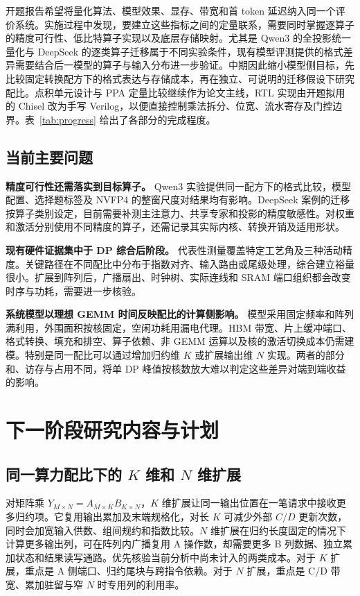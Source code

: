 \documentclass[10.5pt,compsoc,UTF8]{CjC}
\begin{document}
开题报告希望将量化算法、模型效果、显存、带宽和首 token 延迟纳入同一个评价系统。实施过程中发现，要建立这些指标之间的定量联系，需要同时掌握逐算子的精度可行性、低比特算子实现以及底层存储映射。尤其是 Qwen3 的全投影统一量化与 DeepSeek 的逐类算子迁移属于不同实验条件，现有模型评测提供的格式差异需要结合后一模型的算子与输入分布进一步验证。中期因此缩小模型侧目标，先比较固定转换配方下的格式表达与存储成本，再在独立、可说明的迁移假设下研究配比。点积单元设计与 PPA 定量比较继续作为论文主线，RTL 实现由开题拟用的 Chisel 改为手写 Verilog，以便直接控制乘法拆分、位宽、流水寄存及门控边界。表~\ref{tab:progress} 给出了各部分的完成程度。

\subsection{当前主要问题}

\textbf{精度可行性还需落实到目标算子。}
Qwen3 实验提供同一配方下的格式比较，模型配置、选择题标签及 NVFP4 的整窗尺度对结果均有影响。DeepSeek 案例的迁移按算子类别设定，目前需要补测主注意力、共享专家和投影的精度敏感性。对权重和激活分别使用不同精度的算子，还需记录其实际内核、转换开销及适用形状。

\textbf{现有硬件证据集中于 DP 综合后阶段。}
代表性测量覆盖特定工艺角及三种活动精度。关键路径在不同配比中分布于指数对齐、输入路由或尾级处理，综合建立裕量很小。扩展到阵列后，广播扇出、时钟树、实际连线和 SRAM 端口组织都会改变时序与功耗，需要进一步核验。

\textbf{系统模型以理想 GEMM 时间反映配比的计算侧影响。}
模型采用固定频率和阵列满利用，外围面积按核固定，空闲功耗用漏电代理。HBM 带宽、片上缓冲端口、格式转换、填充和排空、算子依赖、非 GEMM 运算以及核的激活切换成本仍需建模。特别是同一配比可以通过增加归约维 $K$ 或扩展输出维 $N$ 实现。两者的部分和、访存与占用不同，将单 DP 峰值按核数放大难以判定这些差异对端到端收益的影响。

\section{下一阶段研究内容与计划}

\subsection{同一算力配比下的 \texorpdfstring{$K$}{K} 维和 \texorpdfstring{$N$}{N} 维扩展}

对矩阵乘 $Y_{M\times N}=A_{M\times K}B_{K\times N}$，$K$ 维扩展让同一输出位置在一笔请求中接收更多归约项。它复用输出累加及末端规格化，对长 $K$ 可减少外部 $C/D$ 更新次数，同时会加宽输入供数、组间规约和指数比较。$N$ 维扩展在归约长度固定的情况下计算更多输出列，可在阵列内广播复用 A 操作数，却需要更多 B 列数据、独立累加状态和结果读写通路。优先核验当前分析中尚未计入的两类成本。对于 $K$ 扩展，重点是 A 侧端口、归约尾块与跨指令依赖。对于 $N$ 扩展，重点是 C/D 带宽、累加驻留与窄 $N$ 时专用列的利用率。
\end{document}
